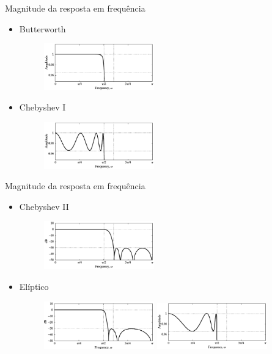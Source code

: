 \begin{slide}{Magnitude da resposta em frequência}
	\begin{itemize}
		\item Butterworth
			\begin{figure}
				\centering 
				\includegraphics[width = 0.45\textwidth]{figs/bmag.eps}
			\end{figure}
		\item Chebyshev I
			\begin{figure}
				\centering 
				\includegraphics[width = 0.45\textwidth]{figs/cmag.eps}
			\end{figure}
	\end{itemize}
\end{slide}
\begin{slide}{Magnitude da resposta em frequência}
	\begin{itemize}
		\item Chebyshev II
			\begin{figure}
				\centering 
				\includegraphics[width = 0.45\textwidth]{figs/c2mag.eps}
			\end{figure}
		\item Elíptico
			\begin{figure}
				\centering 
				\includegraphics[width = 0.45\textwidth]{figs/emag1.eps}
				\includegraphics[width = 0.45\textwidth]{figs/emag2.eps}
			\end{figure}
	\end{itemize}
\end{slide}

